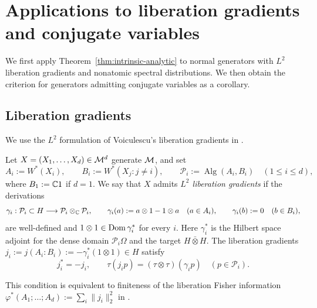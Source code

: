 \section{Applications to liberation gradients and conjugate variables}
\label{sec:conjugate-variable-criterion}

We first apply Theorem~\ref{thm:intrinsic-analytic} to normal generators with $L^2$ liberation gradients and nonatomic spectral distributions.
We then obtain the criterion for generators admitting conjugate variables as a corollary.

\subsection{Liberation gradients}\label{subsec:liberation-gradients}

We use the $L^2$ formulation of Voiculescu's liberation gradients in \cite[5.3--5.4 and Proposition~6.1]{Voi99}.
\begin{definition}\label{def:liberation-gradients}
Let $X=(X_1,\ldots,X_d)\in\mathcal M^d$ generate $\mathcal M$, and set
\[
 A_i:=W^*(X_i),\qquad B_i:=W^*(X_j:j\ne i),\qquad
 \mathcal P_i:=\operatorname{Alg}(A_i,B_i)
 \quad(1\leq i\leq d),
\]
where $B_1:=\mathbb C1$ if $d=1$.
We say that $X$ admits \emph{$L^2$ liberation gradients} if the derivations
\[
 \gamma_i:\mathcal P_i\subset H\longrightarrow
          \mathcal P_i\otimes_{\mathbb C}\mathcal P_i,\qquad
 \gamma_i(a):=a\otimes1-1\otimes a\quad(a\in A_i),\qquad
 \gamma_i(b):=0\quad(b\in B_i),
\]
are well-defined and $1\otimes1\in\operatorname{Dom}\gamma_i^*$ for every $i$.
Here $\gamma_i^*$ is the Hilbert space adjoint for the dense domain $\mathcal P_i\Omega$ and the target $H\bar\otimes H$.
The liberation gradients $j_i:=j(A_i:B_i):=-\gamma_i^*(1\otimes1)\in H$ satisfy
\[
 j_i^*=-j_i,\qquad
 \tau(j_ip)=(\tau\otimes\tau)(\gamma_ip)
 \quad(p\in\mathcal P_i).
\]
\end{definition}
This condition is equivalent to finiteness of the liberation Fisher information
$\varphi^*(A_1;\ldots;A_d):=\sum_i\|j_i\|_2^2$ in \cite[Definition~9.1]{Voi99}.

